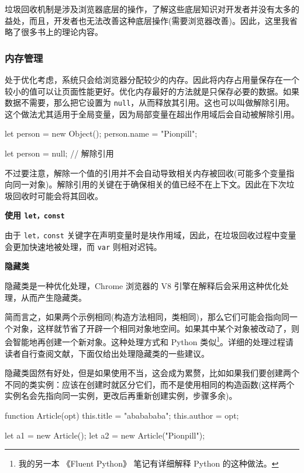 垃圾回收机制是涉及浏览器底层的操作，了解这些底层知识对开发者并没有太多的益处，而且，开发者也无法改善这种底层操作(需要浏览器改善)。因此，这里我省略了很多书上的理论内容。

\subsubsection{内存管理}

处于优化考虑，系统只会给浏览器分配较少的内存。因此将内存占用量保存在一个较小的值可以让页面性能更好。优化内存最好的方法就是只保存必要的数据。如果数据不需要，那么把它设置为 \texttt{null}，从而释放其引用。这也可以叫做解除引用。这个做法尤其适用于全局变量，因为局部变量在超出作用域后会自动被解除引用。

\begin{JavaScript}
let person = new Object();
person.name = "Pionpill";

let person = null;      // 解除引用
\end{JavaScript}

不过要注意，解除一个值的引用并不会自动导致相关内存被回收(可能多个变量指向同一对象)。解除引用的关键在于确保相关的值已经不在上下文。因此在下次垃圾回收时可能会将其回收。

\noindent\textbf{使用 \texttt{let，const}}

由于 \texttt{let，const} 关键字在声明变量时是块作用域，因此，在垃圾回收过程中变量会更加快速地被处理，而 \texttt{var} 则相对迟钝。

\noindent\textbf{隐藏类}

隐藏类是一种优化处理，Chrome 浏览器的 V8 引擎在解释后会采用这种优化处理，从而产生隐藏类。

简而言之，如果两个示例相同(构造方法相同，类相同)，那么它们可能会指向同一个对象，这样就节省了开辟一个相同对象地空间。如果其中某个对象被改动了，则会智能地再创建一个新对象。这种处理方式和 Python 类似\footnote{我的另一本 《Fluent Python》 笔记有详细解释 Python 的这种做法。}。详细的处理过程请读者自行查阅文献，下面仅给出处理隐藏类的一些建议。

隐藏类固然有好处，但是如果使用不当，这会成为累赘，比如如果我们要创建两个不同的类实例：应该在创建时就区分它们，而不是使用相同的构造函数(这样两个实例名会先指向同一实例，更改后再重新创建实例，步骤多余)。

\begin{JavaScript}
function Article(opt) {
    this.title = "ababababa";
    this.author = opt;
}

let a1 = new Article();
let a2 = new Article("Pionpill");
\end{JavaScript}

